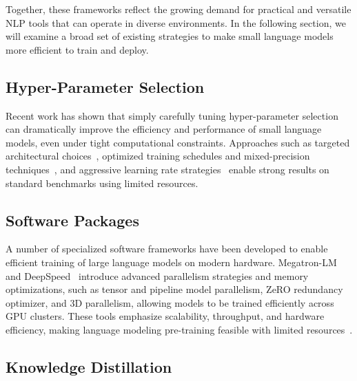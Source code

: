 Together, these frameworks reflect the growing demand for practical and versatile NLP tools that can operate in diverse environments. In the following section, we will examine a broad set of existing strategies to make small language models more efficient to train and deploy.

\subsection{Hyper-Parameter Selection}

Recent work has shown that simply carefully tuning hyper-parameter selection can dramatically improve the efficiency and performance of small language models, even under tight computational constraints. Approaches such as targeted architectural choices~\citep{hillier2024super}, optimized training schedules and mixed-precision techniques~\citep{izsak2021train}, and aggressive learning rate strategies~\citep{geiping2023cramming} enable strong results on standard benchmarks using limited resources.

\subsection{Software Packages}

A number of specialized software frameworks have been developed to enable efficient training of large language models on modern hardware. Megatron-LM~\citep{narayanan2021megatron} and DeepSpeed~\citep{rasley2020deepspeed} introduce advanced parallelism strategies and memory optimizations, such as tensor and pipeline model parallelism, ZeRO redundancy optimizer, and 3D parallelism, allowing models to be trained efficiently across GPU clusters. These tools emphasize scalability, throughput, and hardware efficiency, making language modeling pre-training feasible with limited resources~\citep{rajbhandari2020zero}.


\subsection{Knowledge Distillation}

